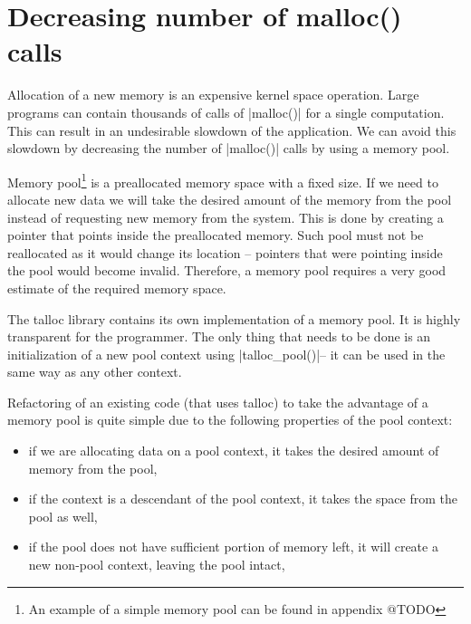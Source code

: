 \section{Decreasing number of malloc() calls}
\label{talloc:pool}

Allocation of a new memory is an expensive kernel space operation. Large
programs can contain thousands of calls of |malloc()| for a single computation.
This can result in an undesirable slowdown of the application. We can avoid
this slowdown by decreasing the number of |malloc()| calls by using a memory
pool.

Memory pool\footnote{An example of a simple memory pool can be found in appendix
@TODO} is a preallocated memory space with a fixed size. If we need to allocate
new data we will take the desired amount of the memory from the pool instead of
requesting new memory from the system. This is done by creating a pointer that
points inside the preallocated memory. Such pool must not be reallocated as it
would change its location -- pointers that were pointing inside the pool would
become invalid. Therefore, a memory pool requires a very good estimate of the
required memory space.

The talloc library contains its own implementation of a memory pool. It is
highly transparent for the programmer. The only thing that needs to be done is
an initialization of a new pool context using |talloc_pool()|\footnotemark --
it can be used in the same way as any other context.


Refactoring of an existing code (that uses talloc) to take the advantage of a
memory pool is quite simple due to the following properties of the pool context:

\begin{itemize}
  \item if we are allocating data on a pool context, it takes the desired
  amount of memory from the pool,
  \item if the context is a descendant of the pool context, it takes the space
  from the pool as well,
  \item if the pool does not have sufficient portion of memory left, it will
  create a new non-pool context, leaving the pool intact,
\end{itemize}

